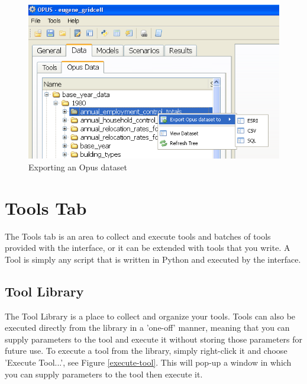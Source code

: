 \begin{figure}[htp]
\begin{center}
\includegraphics[scale=0.8]{part-gui/images/data-manager-opus-data-tab-export-dataset.png}
\end{center}
\caption{Exporting an Opus dataset}
\label{exporting}
\end{figure}

\section{Tools Tab}
The Tools tab is an area to collect and execute tools and batches of tools provided with the interface, or it can be extended with tools that you  write.  A Tool is simply any script that is written in Python and executed by the interface.

\subsection{Tool Library}
The Tool Library is a place to collect and organize your tools.  Tools can also be executed directly from the library in a 'one-off' manner, meaning that you can supply parameters to the tool and execute it without storing those parameters for future use.  To execute a tool from the library, simply right-click it and choose 'Execute Tool...', see Figure \ref{execute-tool}.  This will pop-up a window in which you can supply parameters to the tool then execute it.

